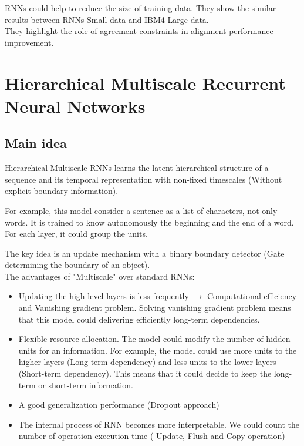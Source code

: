 \documentclass{article}
\begin{document}
RNNs could help to reduce the size of training data. They show the similar results between RNNs-Small data and IBM4-Large data.\\

They highlight the role of agreement constraints in alignment performance improvement.\\




\section{Hierarchical Multiscale Recurrent Neural Networks}

\subsection{Main idea}
Hierarchical Multiscale RNNs learns the latent hierarchical structure of a sequence and its temporal representation with non-fixed timescales (Without explicit boundary information).

For example, this model consider a sentence as a list of characters, not only words. It is trained to know autonomously the beginning and the end of a word. For each layer, it could group the units.

The key idea is an update mechanism with a binary boundary detector (Gate determining the boundary of an object).\\

The advantages of "Multiscale" over standard RNNs:
\begin{itemize}
\item Updating the high-level layers is less frequently $\rightarrow$ Computational efficiency and Vanishing gradient problem. Solving vanishing gradient problem means that this model could delivering efficiently long-term dependencies.
\item Flexible resource allocation. The model could modify the number of hidden units for an information. For example, the model could use more units to the higher layers (Long-term dependency) and less units to the lower layers (Short-term dependency). This means that it could decide to keep the long-term or short-term information.

\item A good generalization performance (Dropout approach)
\item The internal process of RNN becomes more interpretable. We could count the number of operation execution time ( Update, Flush and Copy operation)
\end{itemize}
\end{document}
